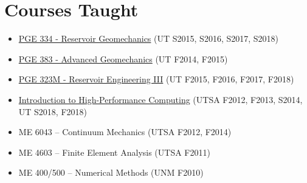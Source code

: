 \section*{Courses Taught}

  \begin{itemize}
      \item \href{http://johnfoster.pge.utexas.edu/PGE334-ResGeomechanics/}{PGE 334 - Reservoir Geomechanics} (UT S2015, S2016, S2017, S2018)
      \item \href{http://johnfoster.pge.utexas.edu/PGE383-AdvGeomechanics/}{PGE 383 - Advanced Geomechanics} (UT F2014, F2015)
      \item \href{http://johnfoster.pge.utexas.edu/PGE323M-ResEngineeringIII/}{PGE 323M - Reservoir Engineering III} (UT F2015, F2016, F2017, F2018)
      \item \href{http://johnfoster.pge.utexas.edu/HPC/}{Introduction to High-Performance Computing} (UTSA F2012, F2013, S2014, UT S2018, F2018)
      \item ME 6043 -- Continuum Mechanics (UTSA F2012, F2014)
      \item ME 4603 -- Finite Element Analysis (UTSA F2011)
      \item ME 400/500 -- Numerical Methods (UNM F2010)
  \end{itemize}

